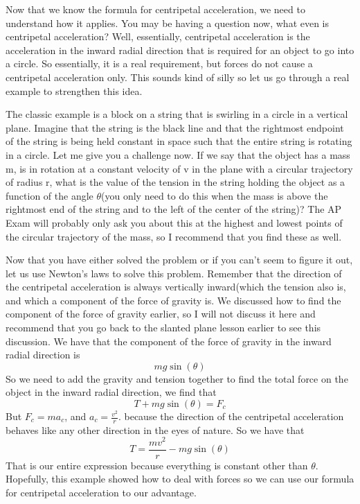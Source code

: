 \documentclass{article}[gray]
\numberwithin{equation}{subsection}
\begin{document}
Now that we know the formula for centripetal acceleration, we need to understand how it applies. You may be having a question now, what even is centripetal acceleration? Well, essentially, centripetal acceleration is the acceleration in the inward radial direction that is required for an object to go into a circle. So essentially, it is a real requirement, but forces do not cause a centripetal acceleration only. This sounds kind of silly so let us go through a real example to strengthen this idea. 

The classic example is a block on a string that is swirling in a circle in a vertical plane. Imagine that the string is the black line and that the rightmost endpoint of the string is being held constant in space such that the entire string is rotating in a circle. Let me give you a challenge now. If we say that the object has a mass m, is in rotation at a constant velocity of v in the plane with a circular trajectory of radius r, what is the value of the tension in the string holding the object as a function of the angle $\theta$(you only need to do this when the mass is above the rightmost end of the string and to the left of the center of the string)? The AP Exam will probably only ask you about this at the highest and lowest points of the circular trajectory of the mass, so I recommend that you find these as well. 

Now that you have either solved the problem or if you can’t seem to figure it out, let us use Newton’s laws to solve this problem. Remember that the direction of the centripetal acceleration is always vertically inward(which the tension also is, and which a component of the force of gravity is. We discussed how to find the component of the force of gravity earlier, so I will not discuss it here and recommend that you go back to the slanted plane lesson earlier to see this discussion. We have that the component of the force of gravity in the inward radial direction is $$mg\sin\left(\theta \right)$$ So we need to add the gravity and tension together to find the total force on the object in the inward radial direction, we find that \begin{equation}T+mg\sin\left(\theta \right)=F_c\end{equation} But $F_c=ma_c$, and $a_c=\frac{v^2}{r}$. because the direction of the centripetal acceleration behaves like any other direction in the eyes of nature. So we have that \begin{equation}T=\frac{mv^2}{r}-mg\sin\left(\theta \right)\end{equation} That is our entire expression because everything is constant other than $\theta$. Hopefully, this example showed how to deal with forces so we can use our formula for centripetal acceleration to our advantage. 
\end{document}
